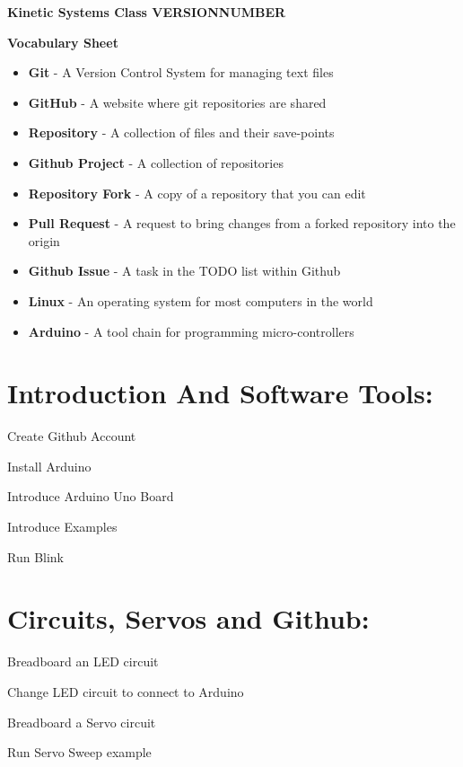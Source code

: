\documentclass{article}
\begin{document}
	
{\huge \textbf{Kinetic Systems Class VERSIONNUMBER}}

\vspace{1cm}

{\huge \textbf{Vocabulary Sheet}}

\begin{itemize}
  \item \textbf{Git} - A Version Control System for managing text files
  \item \textbf{GitHub} - A website where git repositories are shared
  \item \textbf{Repository} - A collection of files and their save-points
  \item \textbf{Github Project} - A collection of repositories 
  \item \textbf{Repository Fork} - A copy of a repository that you can edit
  \item \textbf{Pull Request} - A request to bring changes from a forked repository into the origin
  \item \textbf{Github Issue} - A task in the TODO list within Github
  \item \textbf{Linux } - An operating system for most computers in the world
  \item \textbf{Arduino } - A tool chain for programming micro-controllers 
\end{itemize}

\newpage
\section{Introduction And Software Tools:}
\begin{todolist}
	\item Create Github Account
	\item Install Arduino
	\item Introduce Arduino Uno Board
	\item Introduce Examples
	\item Run Blink
\end{todolist}


\section{Circuits, Servos and Github:}
\begin{todolist}
	\item Breadboard an LED circuit
	\item Change LED circuit to connect to Arduino
	\item Breadboard a Servo circuit
	\item Run Servo Sweep example
\end{todolist}
\end{document}
